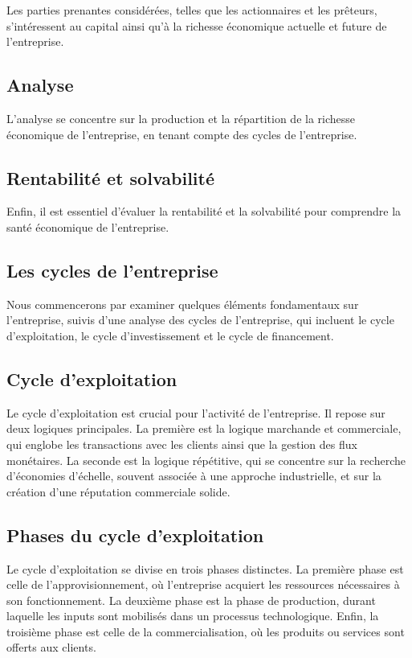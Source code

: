 \documentclass[a4paper, 12pt]{report}
\begin{document}
Les parties prenantes considérées, telles que les actionnaires et les prêteurs, s'intéressent au capital ainsi qu'à la richesse économique actuelle et future de l'entreprise.

\subsection{Analyse}

L'analyse se concentre sur la production et la répartition de la richesse économique de l'entreprise, en tenant compte des cycles de l'entreprise.

\subsection{Rentabilité et solvabilité}

Enfin, il est essentiel d'évaluer la rentabilité et la solvabilité pour comprendre la santé économique de l'entreprise.
	
\subsection{Les cycles de l'entreprise}

Nous commencerons par examiner quelques éléments fondamentaux sur l'entreprise, suivis d'une analyse des cycles de l'entreprise, qui incluent le cycle d'exploitation, le cycle d'investissement et le cycle de financement.

\subsection{Cycle d'exploitation}

Le cycle d'exploitation est crucial pour l'activité de l'entreprise. Il repose sur deux logiques principales. La première est la logique marchande et commerciale, qui englobe les transactions avec les clients ainsi que la gestion des flux monétaires. La seconde est la logique répétitive, qui se concentre sur la recherche d'économies d'échelle, souvent associée à une approche industrielle, et sur la création d'une réputation commerciale solide.

\subsection{Phases du cycle d'exploitation}

Le cycle d'exploitation se divise en trois phases distinctes. La première phase est celle de l'approvisionnement, où l'entreprise acquiert les ressources nécessaires à son fonctionnement. La deuxième phase est la phase de production, durant laquelle les inputs sont mobilisés dans un processus technologique. Enfin, la troisième phase est celle de la commercialisation, où les produits ou services sont offerts aux clients.
	
\end{document}
